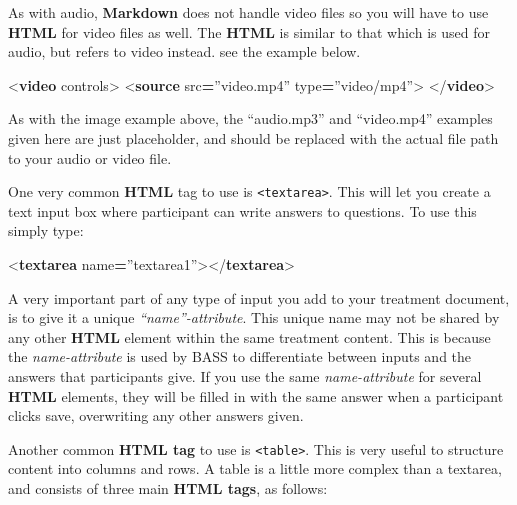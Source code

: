 \documentclass[
]{book}
\newenvironment{Shaded}{\begin{snugshade}}{\end{snugshade}}
\newcommand{\DataTypeTok}[1]{\textcolor[rgb]{0.13,0.29,0.53}{#1}}
\newcommand{\KeywordTok}[1]{\textcolor[rgb]{0.13,0.29,0.53}{\textbf{#1}}}
\newcommand{\OperatorTok}[1]{\textcolor[rgb]{0.81,0.36,0.00}{\textbf{#1}}}
\newcommand{\OtherTok}[1]{\textcolor[rgb]{0.56,0.35,0.01}{#1}}
\newcommand{\StringTok}[1]{\textcolor[rgb]{0.31,0.60,0.02}{#1}}
\begin{document}
As with audio, \textbf{Markdown} does not handle video files so you will have to use \textbf{HTML} for video files as well. The \textbf{HTML} is similar to that which is used for audio, but refers to video instead. see the example below.

\begin{Shaded}
\begin{Highlighting}[]
\DataTypeTok{\textless{}}\KeywordTok{video}\OtherTok{ controls}\DataTypeTok{\textgreater{}}
  \DataTypeTok{\textless{}}\KeywordTok{source}\OtherTok{ src}\OperatorTok{=}\StringTok{”video.mp4”}\OtherTok{ type}\OperatorTok{=}\StringTok{”video/mp4”}\DataTypeTok{\textgreater{}}
\DataTypeTok{\textless{}/}\KeywordTok{video}\DataTypeTok{\textgreater{}}
\end{Highlighting}
\end{Shaded}

As with the image example above, the ``audio.mp3'' and ``video.mp4'' examples given here are just placeholder, and should be replaced with the actual file path to your audio or video file.

One very common \textbf{HTML} tag to use is \texttt{\textless{}textarea\textgreater{}}. This will let you create a text input box where participant can write answers to questions.
To use this simply type:

\begin{Shaded}
\begin{Highlighting}[]
\DataTypeTok{\textless{}}\KeywordTok{textarea}\OtherTok{ name}\OperatorTok{=}\StringTok{”textarea1”}\DataTypeTok{\textgreater{}\textless{}/}\KeywordTok{textarea}\DataTypeTok{\textgreater{}}
\end{Highlighting}
\end{Shaded}

A very important part of any type of input you add to your treatment document, is to give it a unique \emph{``name''-attribute}. This unique name may not be shared by any other \textbf{HTML} element within the same treatment content. This is because the \emph{name-attribute} is used by BASS to differentiate between inputs and the answers that participants give. If you use the same \emph{name-attribute} for several \textbf{HTML} elements, they will be filled in with the same answer when a participant clicks save, overwriting any other answers given.

Another common \textbf{HTML tag} to use is \texttt{\textless{}table\textgreater{}}. This is very useful to structure content into columns and rows.
A table is a little more complex than a textarea, and consists of three main \textbf{HTML tags}, as follows:
\end{document}
